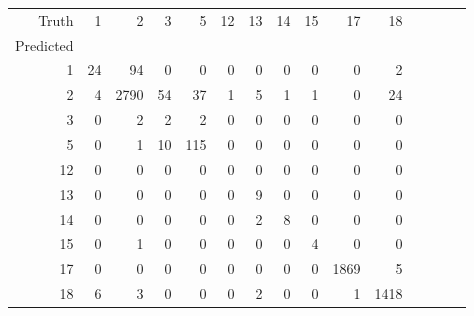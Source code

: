 \begin{table}[h]
\centering
\label{table:5}
\begin{tabular}{rrrrrrrrrrrrrrr}
\toprule
Truth & 1 & 2 & 3 & 5 & 12 & 13 & 14 & 15 & 17 & 18 \\
Predicted &  &  &  &  &  &  &  &  &  &  \\
\midrule
1 & 24 & 94 & 0 & 0 & 0 & 0 & 0 & 0 & 0 & 2 \\
2 & 4 & 2790 & 54 & 37 & 1 & 5 & 1 & 1 & 0 & 24 \\
3 & 0 & 2 & 2 & 2 & 0 & 0 & 0 & 0 & 0 & 0 \\
5 & 0 & 1 & 10 & 115 & 0 & 0 & 0 & 0 & 0 & 0 \\
12 & 0 & 0 & 0 & 0 & 0 & 0 & 0 & 0 & 0 & 0 \\
13 & 0 & 0 & 0 & 0 & 0 & 9 & 0 & 0 & 0 & 0 \\
14 & 0 & 0 & 0 & 0 & 0 & 2 & 8 & 0 & 0 & 0 \\
15 & 0 & 1 & 0 & 0 & 0 & 0 & 0 & 4 & 0 & 0 \\
17 & 0 & 0 & 0 & 0 & 0 & 0 & 0 & 0 & 1869 & 5 \\
18 & 6 & 3 & 0 & 0 & 0 & 2 & 0 & 0 & 1 & 1418 \\
\bottomrule
\end{tabular}
\end{table}
